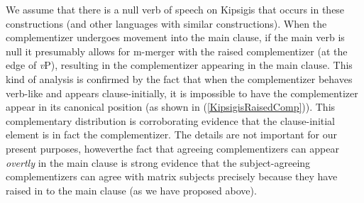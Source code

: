 \documentclass[output=paper
,modfonts
,nonflat
]{langsci/langscibook}
\begin{document}
\noindent We assume that there is a null verb of speech on Kipsigis that occurs in these constructions (and other languages with similar constructions). When the complementizer undergoes movement into the main clause, if the main verb is null it presumably allows for m-merger with the raised complementizer (at the edge of \textit{v}P), resulting in the complementizer appearing in the main clause. This kind of analysis is confirmed by the fact that when the complementizer behaves verb-like and appears clause-initially, it is impossible to have the complementizer appear in its canonical position (as shown in (\ref{KipsigisRaisedComp})). This complementary distribution is corroborating evidence that the clause-initial element is in fact the complementizer. The details are not important for our present purposes, however\textemdash the fact that agreeing complementizers can appear \textit{overtly} in the main clause is strong evidence that the subject-agreeing complementizers can agree with matrix subjects precisely because they have raised in to the main clause (as we have proposed above).  
\end{document}
